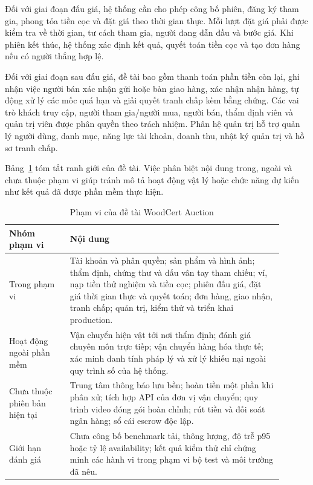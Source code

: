\documentclass[../DoAn.tex]{subfiles}
\begin{document}
Đối với giai đoạn đấu giá, hệ thống cần cho phép công bố phiên, đăng ký tham gia, phong tỏa tiền cọc và đặt giá theo thời gian thực. Mỗi lượt đặt giá phải được kiểm tra về thời gian, tư cách tham gia, người đang dẫn đầu và bước giá. Khi phiên kết thúc, hệ thống xác định kết quả, quyết toán tiền cọc và tạo đơn hàng nếu có người thắng hợp lệ.

Đối với giai đoạn sau đấu giá, đề tài bao gồm thanh toán phần tiền còn lại, ghi nhận việc người bán xác nhận gửi hoặc bàn giao hàng, xác nhận nhận hàng, tự động xử lý các mốc quá hạn và giải quyết tranh chấp kèm bằng chứng. Các vai trò khách truy cập, người tham gia/người mua, người bán, thẩm định viên và quản trị viên được phân quyền theo trách nhiệm. Phân hệ quản trị hỗ trợ quản lý người dùng, danh mục, năng lực tài khoản, doanh thu, nhật ký quản trị và hồ sơ tranh chấp.

Bảng~\ref{tab:chapter1-scope} tóm tắt ranh giới của đề tài. Việc phân biệt nội dung trong, ngoài và chưa thuộc phạm vi giúp tránh mô tả hoạt động vật lý hoặc chức năng dự kiến như kết quả đã được phần mềm thực hiện.

\begin{table}[H]
\centering
\small
\renewcommand{\arraystretch}{1.2}
\begin{tabular}{|>{\raggedright\arraybackslash}p{0.20\linewidth}|
                >{\raggedright\arraybackslash}p{0.70\linewidth}|}
\hline
\textbf{Nhóm phạm vi} & \textbf{Nội dung} \\ \hline
Trong phạm vi &
Tài khoản và phân quyền; sản phẩm và hình ảnh; thẩm định, chứng thư và dấu vân tay tham chiếu; ví, nạp tiền thử nghiệm và tiền cọc; phiên đấu giá, đặt giá thời gian thực và quyết toán; đơn hàng, giao nhận, tranh chấp; quản trị, kiểm thử và triển khai production. \\ \hline
Hoạt động ngoài phần mềm &
Vận chuyển hiện vật tới nơi thẩm định; đánh giá chuyên môn trực tiếp; vận chuyển hàng hóa thực tế; xác minh danh tính pháp lý và xử lý khiếu nại ngoài quy trình số của hệ thống. \\ \hline
Chưa thuộc phiên bản hiện tại &
Trung tâm thông báo lưu bền; hoàn tiền một phần khi phân xử; tích hợp API của đơn vị vận chuyển; quy trình video đóng gói hoàn chỉnh; rút tiền và đối soát ngân hàng; sổ cái escrow độc lập. \\ \hline
Giới hạn đánh giá &
Chưa công bố benchmark tải, thông lượng, độ trễ p95 hoặc tỷ lệ availability; kết quả kiểm thử chỉ chứng minh các hành vi trong phạm vi bộ test và môi trường đã nêu. \\ \hline
\end{tabular}
\caption{Phạm vi của đề tài WoodCert Auction}
\label{tab:chapter1-scope}
\end{table}
\end{document}

